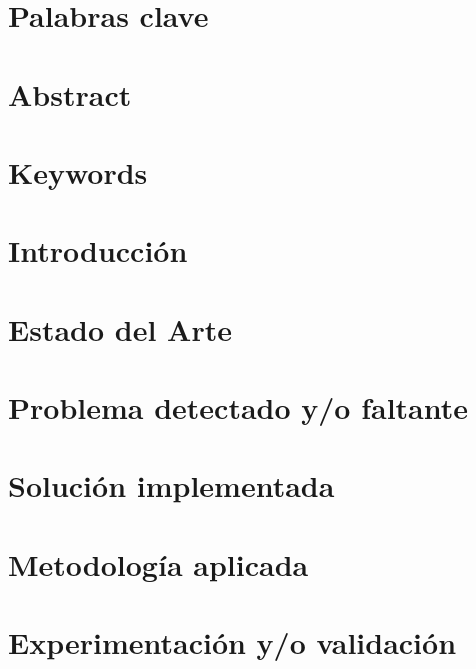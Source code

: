 \documentclass[11pt]{article}
\begin{document}
\section{Palabras clave}



\newpage

\vspace{5mm} %

\section{Abstract}



\section{Keywords}



\newpage

\section{Introducción}



\section{Estado del Arte}



\section{Problema detectado y/o faltante}



\section{Solución implementada}



\section{Metodología aplicada}



\section{Experimentación y/o validación}
\end{document}
